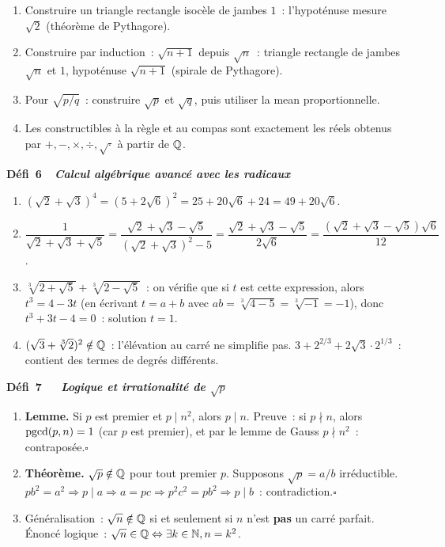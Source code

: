 \begin{enumerate}
  \item Construire un triangle rectangle isoc\`ele de jambes $1$~:
        l'hypot\'enuse mesure $\sqrt{2}$ (th\'eor\`eme de Pythagore).
  \item Construire par induction~: $\sqrt{n+1}$ depuis $\sqrt{n}$~:
        triangle rectangle de jambes $\sqrt{n}$ et $1$,
        hypot\'enuse $\sqrt{n+1}$ (spirale de Pythagore).
  \item Pour $\sqrt{p/q}$~: construire $\sqrt{p}$ et $\sqrt{q}$,
        puis utiliser la mean proportionnelle.
  \item Les constructibles \`a la r\`egle et au compas sont exactement
        les r\'eels obtenus par $+,-,\times,\div,\sqrt{\cdot}$ \`a partir
        de $\mathbb{Q}$.
\end{enumerate}

\noindent{}
{\color{BO}\bfseries\small D\'efi~6~\textendash\ \textit{Calcul alg\'ebrique avanc\'e avec les radicaux}}
\par\smallskip

\begin{enumerate}
  \item $(\sqrt{2}+\sqrt{3})^4=(5+2\sqrt{6})^2=25+20\sqrt{6}+24=49+20\sqrt{6}$.
  \item $\dfrac{1}{\sqrt{2}+\sqrt{3}+\sqrt{5}}=\dfrac{\sqrt{2}+\sqrt{3}-\sqrt{5}}{(\sqrt{2}+\sqrt{3})^2-5}=\dfrac{\sqrt{2}+\sqrt{3}-\sqrt{5}}{2\sqrt{6}}=\dfrac{(\sqrt{2}+\sqrt{3}-\sqrt{5})\sqrt{6}}{12}$.
  \item $\sqrt[3]{2+\sqrt{5}}+\sqrt[3]{2-\sqrt{5}}$~: on v\'erifie que si $t$ est cette expression,
        alors $t^3=4-3t$ (en \'ecrivant $t=a+b$ avec $ab=\sqrt[3]{4-5}=\sqrt[3]{-1}=-1$),
        donc $t^3+3t-4=0$~: solution $t=1$.
  \item $(\sqrt{3}+\sqrt[3]{2})^2\notin\mathbb{Q}$~: l'\'el\'evation au carr\'e ne simplifie pas.
        $3+2^{2/3}+2\sqrt{3}\cdot2^{1/3}$~: contient des termes de degr\'es diff\'erents.
\end{enumerate}

\noindent{}
{\color{BO}\bfseries\small D\'efi~7~\textendash\ \textit{\logiq\ Logique et irrationalit\'e de $\sqrt{p}$}}
\par\smallskip

\begin{enumerate}
  \item \textbf{Lemme.} Si $p$ est premier et $p\mid n^2$, alors $p\mid n$.
        Preuve~: si $p\nmid n$, alors $\operatorname{pgcd}(p,n)=1$ (car $p$ est premier),
        et par le lemme de Gauss $p\nmid n^2$~: contrapos\'ee.\hfill$\square$
  \item \textbf{Th\'eor\`eme.} $\sqrt{p}\notin\mathbb{Q}$ pour tout premier $p$.
        Supposons $\sqrt{p}=a/b$ irr\'eductible.
        $p b^2=a^2 \Rightarrow p\mid a \Rightarrow a=pc \Rightarrow p^2c^2=pb^2
        \Rightarrow p\mid b$~: contradiction.\hfill$\square$
  \item G\'en\'eralisation~: $\sqrt{n}\notin\mathbb{Q}$ si et seulement si
        $n$ n'est \textbf{pas} un carr\'e parfait.
        \'Enonc\'e logique~: $\sqrt{n}\in\mathbb{Q} \Leftrightarrow \exists k\in\mathbb{N}, n=k^2$.
\end{enumerate}

